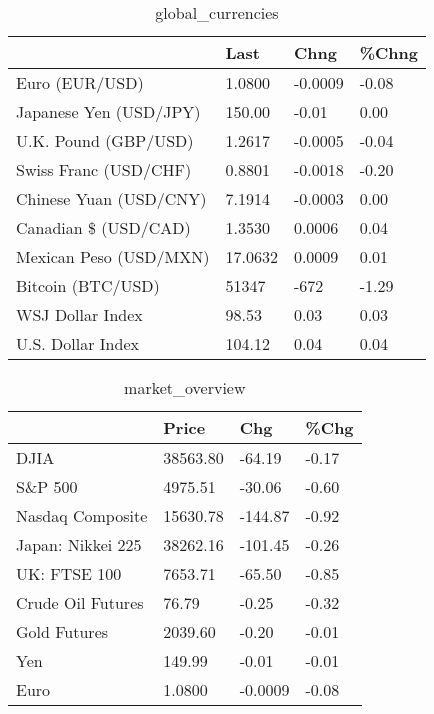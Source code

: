 \documentclass{article}%
\begin{document}
%


\begin{table}[htbp]%
\caption{global\_currencies}%
\centering%
\begin{adjustbox}{width=1\textwidth}%
\begin{tabular}{llll}
\toprule
                       &    Last &    Chng & \%Chng \\
\midrule
        Euro (EUR/USD) &  1.0800 & -0.0009 & -0.08 \\
Japanese Yen (USD/JPY) &  150.00 &   -0.01 &  0.00 \\
  U.K. Pound (GBP/USD) &  1.2617 & -0.0005 & -0.04 \\
 Swiss Franc (USD/CHF) &  0.8801 & -0.0018 & -0.20 \\
Chinese Yuan (USD/CNY) &  7.1914 & -0.0003 &  0.00 \\
  Canadian \$ (USD/CAD) &  1.3530 &  0.0006 &  0.04 \\
Mexican Peso (USD/MXN) & 17.0632 &  0.0009 &  0.01 \\
     Bitcoin (BTC/USD) &   51347 &    -672 & -1.29 \\
      WSJ Dollar Index &   98.53 &    0.03 &  0.03 \\
     U.S. Dollar Index &  104.12 &    0.04 &  0.04 \\
\bottomrule
\end{tabular}
%
\end{adjustbox}%
\end{table}

%


\begin{table}[htbp]%
\caption{market\_overview}%
\centering%
\begin{adjustbox}{width=1\textwidth}%
\begin{tabular}{llll}
\toprule
                  &    Price &     Chg &  \%Chg \\
\midrule
             DJIA & 38563.80 &  -64.19 & -0.17 \\
          S\&P 500 &  4975.51 &  -30.06 & -0.60 \\
 Nasdaq Composite & 15630.78 & -144.87 & -0.92 \\
Japan: Nikkei 225 & 38262.16 & -101.45 & -0.26 \\
     UK: FTSE 100 &  7653.71 &  -65.50 & -0.85 \\
Crude Oil Futures &    76.79 &   -0.25 & -0.32 \\
     Gold Futures &  2039.60 &   -0.20 & -0.01 \\
              Yen &   149.99 &   -0.01 & -0.01 \\
             Euro &   1.0800 & -0.0009 & -0.08 \\
\bottomrule
\end{tabular}
%
\end{adjustbox}%
\end{table}

%
\end{document}
